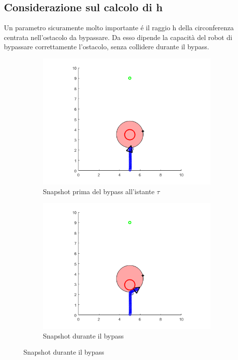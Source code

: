 \documentclass[14pt,a4paper]{extarticle}
\begin{document}
\subsection{Considerazione sul calcolo di h}

Un parametro sicuramente molto importante é il raggio h della circonferenza centrata nell'ostacolo da bypassare. Da esso dipende la capacità del robot di bypassare correttamente l'ostacolo, senza collidere durante il bypass.

\begin{figure}[H]
\begin{subfigure}[b]{0.5\textwidth}
\centering
\caption{Snapshot prima del bypass all'istante \(\tau\)}
\includegraphics[width=\textwidth]{hmax_1.png}
\end{subfigure}
\hfill
\begin{subfigure}[b]{0.5\textwidth}
\centering
\caption{Snapshot durante il bypass}
\includegraphics[width=\textwidth]{hmax_2.png}

\end{subfigure}
\end{figure}
\end{document}
